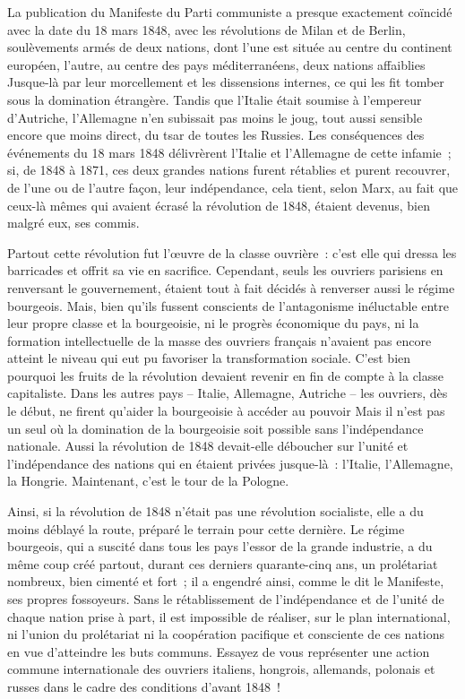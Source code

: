\documentclass[french,twoside]{book} %
\newcommand{\salute}[1]{\bigbreak{#1}\par\medbreak}
\begin{document}
\salute{Au lecteur italien,}
\noindent La publication du Manifeste du Parti communiste a presque exactement coïncidé avec la date du 18 mars 1848, avec les révolutions de Milan et de Berlin, soulèvements armés de deux nations, dont l’une est située au centre du continent européen, l’autre, au centre des pays méditerranéens, deux nations affaiblies Jusque-là par leur morcellement et les dissensions internes, ce qui les fit tomber sous la domination étrangère. Tandis que l’Italie était soumise à l’empereur d’Autriche, l’Allemagne n’en subissait pas moins le joug, tout aussi sensible encore que moins direct, du tsar de toutes les Russies. Les conséquences des événements du 18 mars 1848 délivrèrent l’Italie et l’Allemagne de cette infamie ; si, de 1848 à 1871, ces deux grandes nations furent rétablies et purent recouvrer, de l’une ou de l’autre façon, leur indépendance, cela tient, selon Marx, au fait que ceux-là mêmes qui avaient écrasé la révolution de 1848, étaient devenus, bien malgré eux, ses commis.\par
Partout cette révolution fut l’œuvre de la classe ouvrière : c’est elle qui dressa les barricades et offrit sa vie en sacrifice. Cependant, seuls les ouvriers parisiens en renversant le gouvernement, étaient tout à fait décidés à renverser aussi le régime bourgeois. Mais, bien qu’ils fussent conscients de l’antagonisme inéluctable entre leur propre classe et la bourgeoisie, ni le progrès économique du pays, ni la formation intellectuelle de la masse des ouvriers français n’avaient pas encore atteint le niveau qui eut pu favoriser la transformation sociale. C'est bien pourquoi les fruits de la révolution devaient revenir en fin de compte à la classe capitaliste. Dans les autres pays – Italie, Allemagne, Autriche – les ouvriers, dès le début, ne firent qu’aider la bourgeoisie à accéder au pouvoir Mais il n’est pas un seul où la domination de la bourgeoisie soit possible sans l’indépendance nationale. Aussi la révolution de 1848 devait-elle déboucher sur l’unité et l’indépendance des nations qui en étaient privées jusque-là : l’Italie, l’Allemagne, la Hongrie. Maintenant, c’est le tour de la Pologne.\par
Ainsi, si la révolution de 1848 n’était pas une révolution socialiste, elle a du moins déblayé la route, préparé le terrain pour cette dernière. Le régime bourgeois, qui a suscité dans tous les pays l’essor de la grande industrie, a du même coup créé partout, durant ces derniers quarante-cinq ans, un prolétariat nombreux, bien cimenté et fort ; il a engendré ainsi, comme le dit le Manifeste, ses propres fossoyeurs. Sans le rétablissement de l’indépendance et de l’unité de chaque nation prise à part, il est impossible de réaliser, sur le plan international, ni l’union du prolétariat ni la coopération pacifique et consciente de ces nations en vue d’atteindre les buts communs. Essayez de vous représenter une action commune internationale des ouvriers italiens, hongrois, allemands, polonais et russes dans le cadre des conditions d’avant 1848 !\par
\end{document}

